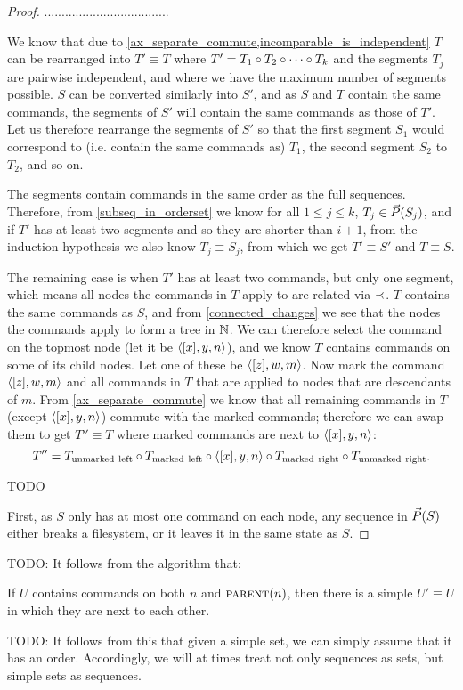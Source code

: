 \begin{proof}
....................................

We know that due to \cref{ax_separate_commute,incomparable_is_independent}
$T$ can be rearranged into $T'\equiv T$ where
$T'=T_1\circ T_2\circ \cdots \circ T_k$ and the segments $T_j$ are pairwise independent,
and where we have the maximum number of segments possible.
$S$ can be converted similarly into $S'$, and
as $S$ and $T$ contain the same commands,
the segments of $S'$ will contain the same commands as those of $T'$.
Let us therefore rearrange the segments of $S'$ so that the first segment
$S_1$ would correspond to (i.e. contain the same commands as) $T_1$, the second segment $S_2$ to $T_2$,
and so on.

The segments contain commands in the same order as the full sequences.
Therefore, from \cref{subseq_in_orderset}
we know for all $1\leq j\leq k$, $T_j\in\vec{P}({S_j})$,
and if $T'$ has at least two segments and so 
they are shorter than $i+1$,
from the induction hypothesis
we also know $T_j\equiv S_j$, from which we get $T'\equiv S'$ and $T\equiv S$.

The remaining case is when $T'$ has at least two commands,
but only one segment, which means
all nodes the commands in $T$ apply to are related via $\prec$.
$T$ contains the same commands as $S$, and
from \cref{connected_changes} we see that the nodes the commands apply to form a tree in $\mathbb{N}$.
We can therefore select the command on the topmost node (let it be $\langle{[x],y,n}\rangle$),
and we know $T$ contains commands on some of its child nodes.
Let one of these be $\langle{[z],w,m}\rangle$.
Now mark the command $\langle{[z],w,m}\rangle$ and all commands in $T$ that are applied to nodes that are descendants of $m$.
From \cref{ax_separate_commute} we know that all remaining commands in $T$ (except $\langle{[x],y,n}\rangle$)
commute with the marked commands; therefore we can swap them to get $T''\equiv T$
where marked commands are next to $\langle{[x],y,n}\rangle$:
\[ T'' = T_\mathrm{unmarked\ left} \circ T_\mathrm{marked\ left} \circ \langle{[x],y,n}\rangle \circ T_\mathrm{marked\ right} \circ T_\mathrm{unmarked\ right}. \]


TODO




First, as $S$ only has at most one command on each node,
any sequence in $\vec{P}({S})$ either breaks a filesystem,
or it leaves it in the same state as $S$.
\end{proof}






TODO:
It follows from the algorithm that:
\begin{mycor}\label{lemma:neighbor}
If $U$ contains commands on both $n$ and $\text{\normalfont\scshape{parent}}(n)$, then
there is a simple $U'\equiv U$ in which they are next to each other.
\end{mycor}


TODO:
It follows from this that given a simple set,
we can simply assume that it has an order.
Accordingly, we will at times treat not only sequences as sets,
but simple sets as sequences.

